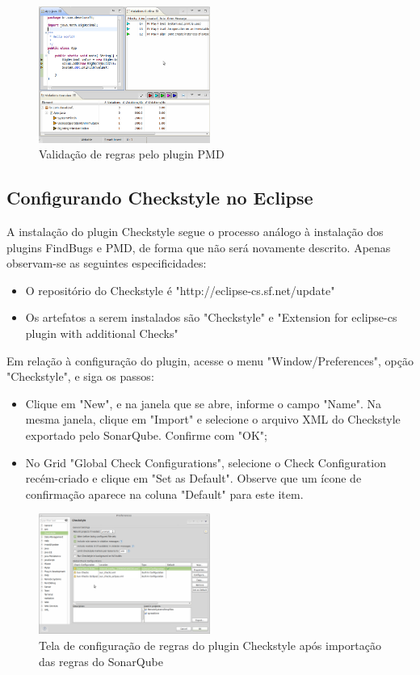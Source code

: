 \documentclass[12pt,journal,compsoc]{IEEEtran}
\begin{document}
\begin{figure}[ht!]
\centering
\includegraphics[width=0.5\textwidth]{img/eclipse-pmd-02}
\caption{Validação de regras pelo plugin PMD}
\label{eclipse-pmd-02}
\end{figure}

 
\subsection{Configurando Checkstyle no Eclipse}

A instalação do plugin Checkstyle\cite{checkstyle_eclipse_plugin} segue o processo análogo à instalação dos plugins FindBugs e PMD, de forma que não será novamente descrito. Apenas observam-se as seguintes especificidades:

\begin{itemize}
\item O repositório do Checkstyle é "http://eclipse-cs.sf.net/update"
\item Os artefatos a serem instalados são "Checkstyle" e "Extension for eclipse-cs plugin with additional Checks"
\end{itemize}
  
Em relação à configuração do plugin, acesse o menu "Window/Preferences", opção "Checkstyle", e siga os passos:

\begin{itemize}
\item Clique em "New", e na janela que se abre, informe o campo "Name". Na mesma janela, clique em "Import" e selecione o arquivo XML do Checkstyle exportado pelo SonarQube. Confirme com "OK"; 
\item No Grid "Global Check Configurations", selecione o Check Configuration recém-criado e clique em "Set as Default". Observe que um ícone de confirmação aparece na coluna "Default" para este item.
\end{itemize}

\begin{figure}[ht!]
\centering
\includegraphics[width=0.5\textwidth]{img/eclipse-checkstyle-01}
\caption{Tela de configuração de regras do plugin Checkstyle após importação das regras do SonarQube}
\label{eclipse-checkstyle-01}
\end{figure}
\end{document}
